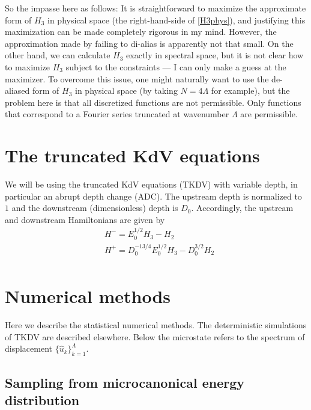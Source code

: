 \documentclass[12pt]{article}
\newcommand{\uhat}{\hat{u}}
\begin{document}
So the impasse here as follows: It is straightforward to maximize the approximate form of $H_3$ in physical space (the right-hand-side of \eqref{H3phys}), and justifying this maximization can be made completely rigorous in my mind. However, the approximation made by failing to di-alias is apparently not that small. On the other hand, we can calculate $H_3$ exactly in spectral space, but it is not clear how to maximize $H_3$ subject to the constraints --- I can only make a guess at the maximizer. To overcome this issue, one might naturally want to use the de-aliased form of $H_3$ in physical space (by taking $N = 4 \Lambda$ for example), but the problem here is that all discretized functions are not permissible. Only functions that correspond to a Fourier series truncated at wavenumber $\Lambda$ are permissible.


\section{The truncated KdV equations}

We will be using the truncated KdV equations (TKDV) with variable depth, in particular an abrupt depth change (ADC). The upstream depth is normalized to $1$ and the downstream (dimensionless) depth is $D_0$. Accordingly, the upstream and downstream Hamiltonians are given by
\begin{align}
\label{Hamiltonian}
& H^- = E_0^{1/2} H_3 - H_2 \\
& H^+ = D_0^{-13/4} E_0^{1/2} H_3 - D_0^{3/2} H_2 \\
\end{align}


\section{Numerical methods}

Here we describe the statistical numerical methods. The deterministic simulations of TKDV are described elsewhere. Below the microstate refers to the spectrum of displacement $\{ \uhat_k \}_{k=1}^{\Lambda}$.

\subsection{Sampling from microcanonical energy distribution}
\end{document}
